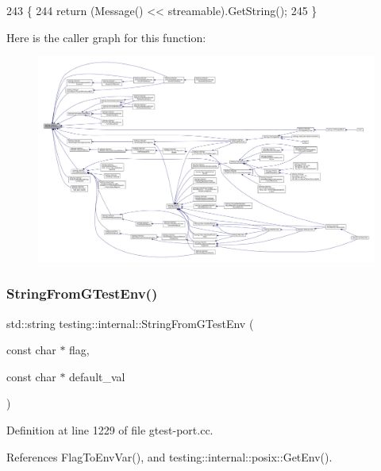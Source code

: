 \begin{DoxyCode}
243                                                   \{
244   \textcolor{keywordflow}{return} (Message() << streamable).GetString();
245 \}
\end{DoxyCode}
Here is the caller graph for this function\+:
\nopagebreak
\begin{figure}[H]
\begin{center}
\leavevmode
\includegraphics[width=350pt]{namespacetesting_1_1internal_aad4beed95d0846e6ffc5da0978ef3bb9_icgraph}
\end{center}
\end{figure}
\mbox{\label{namespacetesting_1_1internal_ac54dabc540bf79c2de91add679bfb93b}} 
\subsubsection{\texorpdfstring{String\+From\+G\+Test\+Env()}{StringFromGTestEnv()}}
{\footnotesize\ttfamily std\+::string testing\+::internal\+::\+String\+From\+G\+Test\+Env (\begin{DoxyParamCaption}\item[{const char $\ast$}]{flag,  }\item[{const char $\ast$}]{default\+\_\+val }\end{DoxyParamCaption})}



Definition at line 1229 of file gtest-\/port.\+cc.



References Flag\+To\+Env\+Var(), and testing\+::internal\+::posix\+::\+Get\+Env().



